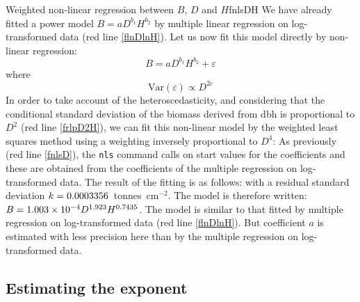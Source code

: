 \begin{filrouge}{Weighted non-linear regression between $B$, $D$ and $H$}{fnlsDH}%
We have already fitted a power model $B=aD^{b_1}H^{b_2}$ by multiple linear regression on log-transformed data (red line \ref{flnDlnH}). Let us now fit this model directly by non-linear regression:
\[
B=aD^{b_1}H^{b_2}+\varepsilon
\]
where
\[
\mathrm{Var}(\varepsilon)\propto D^{2c}
\]
In order to take account of the heteroscedasticity, and considering that the conditional standard deviation of the biomass derived from dbh is proportional to $D^2$ (red line \ref{frlpD2H}), we can fit this non-linear model by the weighted least squares method using a weighting inversely proportional to $D^4$:
%
As previously (red line \ref{fnlsD}), the \texttt{nls} command calls on start values for the coefficients and these are obtained from the coefficients of the multiple regression on log-transformed data. The result of the fitting is as follows:
%
with a residual standard deviation $k=\mbox{0.0003356}$~tonnes~cm$^{-2}$. The model is therefore written: $B=\mbox{1.003}\times10^{-4}D^{1.923}H^{0.7435}$. The model is similar to that fitted by multiple regression on log-transformed data (red line \ref{flnDlnH}). But coefficient $a$ is estimated with less precision here than by the multiple regression on log-transformed data.
\end{filrouge}

\subsection{Estimating the exponent}

